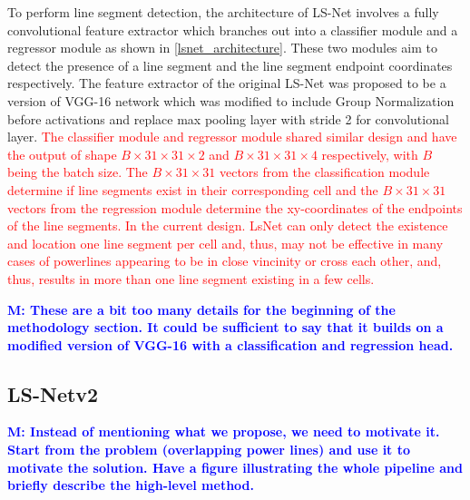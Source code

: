\documentclass[journal]{IEEEtran}
\newcommand{\commentM}[1]{\textbf{\textcolor{blue}{M: #1}}}
\begin{document}
To perform line segment detection, the architecture of LS-Net involves a fully convolutional feature extractor which branches out into a classifier module and a regressor module as shown in \ref{lsnet_architecture}. These two modules aim to detect the presence of a line segment and the line segment endpoint coordinates respectively. The feature extractor of the original LS-Net was proposed to be a version of VGG-16 network \cite{VGG16} which was modified to include Group Normalization \cite{group_norm} before activations and replace max pooling layer with stride 2 for convolutional layer. \textcolor{red}{The classifier module and regressor module shared similar design and have the output of shape $B \times 31 \times 31 \times 2$ and $B \times 31 \times 31 \times 4$ respectively, with $B$ being the batch size. The $B \times 31 \times 31$ vectors from the classification module determine if line segments exist in their corresponding cell and the $B \times 31 \times 31$ vectors from the regression module determine the xy-coordinates of the endpoints of the line segments. In the current design. LsNet can only detect the existence and location one line segment per cell and, thus, may not be effective in many cases of powerlines appearing to be in close vincinity or cross each other, and, thus, results in more than one line segment existing in a few cells.}

\commentM{These are a bit too many details for the beginning of the methodology section. It could be sufficient to say that it builds on a modified version of VGG-16 with a classification and regression head.}

\subsection{LS-Netv2}
\commentM{Instead of mentioning what we propose, we need to motivate it. Start from the problem (overlapping power lines) and use it to motivate the solution. Have a figure illustrating the whole pipeline and briefly describe the high-level method.}
\end{document}
